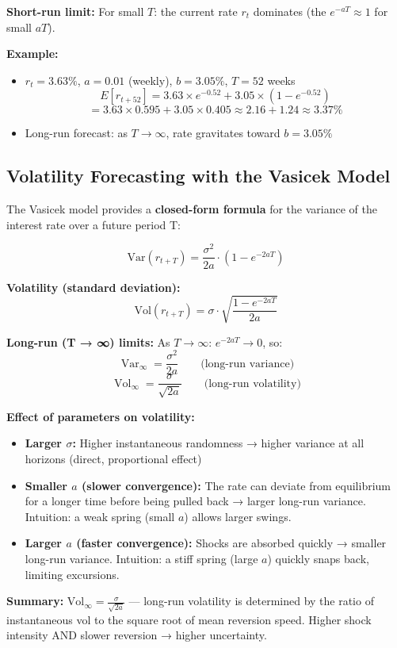 \documentclass[12pt,openany]{book}
\theoremstyle{definition}
\theoremstyle{remark}
\begin{document}
\textbf{Short-run limit:} For small $T$: the current rate $r_t$ dominates (the $e^{-aT} \approx 1$ for small $aT$).

\textbf{Example:}

\begin{itemize}
\item $r_t = 3.63\%$, $a = 0.01$ (weekly), $b = 3.05\%$, $T = 52$ weeks \[
E[r_{t+52}] = 3.63 \times e^{-0.52} + 3.05 \times (1 - e^{-0.52})
\] \[
= 3.63 \times 0.595 + 3.05 \times 0.405 \approx 2.16 + 1.24 \approx 3.37\%
\]


\item Long-run forecast: as $T \to \infty$, rate gravitates toward $b = 3.05\%$


\end{itemize}
\medskip
\subsection{Volatility Forecasting with the Vasicek Model}
The Vasicek model provides a \textbf{closed-form formula} for the variance of the interest rate over a future period T:

\[
\text{Var}(r_{t+T}) = \frac{\sigma^2}{2a} \cdot \left(1 - e^{-2aT}\right)
\]

\textbf{Volatility (standard deviation):} \[
\text{Vol}(r_{t+T}) = \sigma \cdot \sqrt{\frac{1 - e^{-2aT}}{2a}}
\]

\textbf{Long-run (T → ∞) limits:} As $T \to \infty$: $e^{-2aT} \to 0$, so: \[
\operatorname{Var}_{\infty}=\frac{\sigma^2}{2a}
\qquad \text{(long-run variance)}
\] \[
\operatorname{Vol}_{\infty}=\frac{\sigma}{\sqrt{2a}}
\qquad \text{(long-run volatility)}
\]

\textbf{Effect of parameters on volatility:}

\begin{itemize}
\item \textbf{Larger \(\sigma\):} Higher instantaneous randomness → higher variance at all horizons (direct, proportional effect)


\item \textbf{Smaller $a$ (slower convergence):} The rate can deviate from equilibrium for a longer time before being pulled back → larger long-run variance. Intuition: a weak spring (small $a$) allows larger swings.


\item \textbf{Larger $a$ (faster convergence):} Shocks are absorbed quickly → smaller long-run variance. Intuition: a stiff spring (large $a$) quickly snaps back, limiting excursions.


\end{itemize}
\textbf{Summary:} $\text{Vol}_\infty = \frac{\sigma}{\sqrt{2a}}$ --- long-run volatility is determined by the ratio of instantaneous vol to the square root of mean reversion speed. Higher shock intensity AND slower reversion → higher uncertainty.
\end{document}
